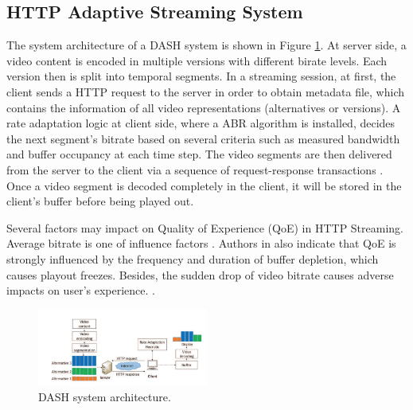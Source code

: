 \documentclass[journal]{IEEEtran}
\begin{document}
\subsection{HTTP Adaptive Streaming System}
The system architecture of a DASH system is shown in Figure \ref{DASH sys}. At server side, a video content is encoded in multiple versions with different birate levels. Each version then is split into temporal segments. In a streaming session, at first, the client sends a HTTP request to the server in order to obtain metadata file, which contains the information of all video representations (alternatives or versions). A rate adaptation logic at client side, where a ABR algorithm is installed, decides the next segment's bitrate based on several criteria such as measured bandwidth and buffer occupancy at each time step. The video segments are then delivered from the server to the client via a sequence of request-response transactions \cite{thang}. Once a video segment is decoded completely in the client, it will be stored in the client's buffer before being played out.
\par Several factors may impact on Quality of Experience (QoE) in HTTP Streaming. Average bitrate is one of  influence factors \cite{Avg rate}. Authors in \cite{QoE calcu} also indicate that QoE is strongly influenced by the frequency and duration of buffer depletion, which causes playout freezes. Besides, the sudden drop of video bitrate causes adverse impacts on user's experience. \cite{decrease rate}. 
\begin{figure}[!h]
\centering
\includegraphics[width=0.5\textwidth]{images/System.PNG}
\captionsetup{justification=centering}
\caption{DASH system architecture.}
\label{DASH sys}
\end{figure}
\end{document}

